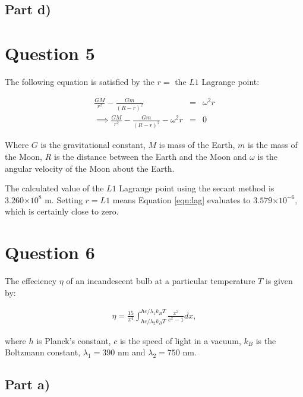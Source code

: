 \documentclass[a4paper,12pt]{article}
\providecommand{\e}[1]{\ensuremath{\times 10^{#1}}}
\begin{document}
\subsection{Part d)}

\section{Question 5}

The following equation is satisfied by the $r =$ the $L1$ Lagrange point:

\begin{eqnarray}
\frac{GM}{r^2} - \frac{Gm}{(R-r)^2} &=& \omega^2r\nonumber\\
\implies \frac{GM}{r^2} - \frac{Gm}{(R-r)^2} - \omega^2r &=& 0
\label{eqn:lag}
\end{eqnarray}

Where $G$ is the gravitational constant, $M$ is mass of the Earth, $m$ is the mass of the Moon, $R$ is the distance between the Earth and the Moon and $\omega$ is the angular velocity of the Moon about the Earth.

The calculated value of the $L1$ Lagrange point using the secant method is $3.260\e{8}$ m. Setting $r = L1$ means Equation \ref{eqn:lag} evaluates to $3.579\e{-6}$, which is certainly close to zero.

\section{Question 6}

The effeciency $\eta$ of an incandescent bulb at a particular temperature $T$ is given by:

\begin{eqnarray}
\eta = \frac{15}{\pi^4}\int_{hc/\lambda_2 k_B T}^{hc/\lambda_1 k_B T} \frac{x^3}{e^x - 1} dx,\nonumber
\end{eqnarray}

where $h$ is Planck's constant, $c$ is the speed of light in a vacuum, $k_B$ is the Boltzmann constant, $\lambda_1 = 390$ nm and $\lambda_2 = 750$ nm.

\subsection{Part a)}
\end{document}
